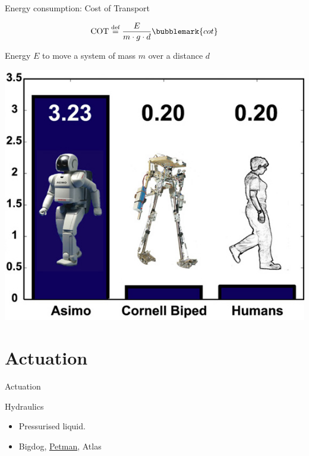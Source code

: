 \documentclass[compress]{beamer}
\begin{document}



\begin{frame}{Energy consumption: Cost of Transport}
    
    \begin{center}

    \Large
    \[
        \mathrm{COT} \overset{\text{def}}= \frac{E}{m\cdot g\cdot d}\bubblemark{cot}
    \]

    \small
    Energy $E$ to move a system of mass $m$ over a distance $d$

        \includegraphics[width=0.5\linewidth]{cost_of_transport}
    \end{center}

\end{frame}

\section{Actuation}

\begin{frame}{Actuation}

    Hydraulics

    \begin{itemize}

        \item Pressurised liquid.
        \item Bigdog, \href{http://www.youtube.com/watch?v=QRbvNL1PHKg}{Petman}, Atlas
    \end{itemize}
\end{frame}

\end{document}
